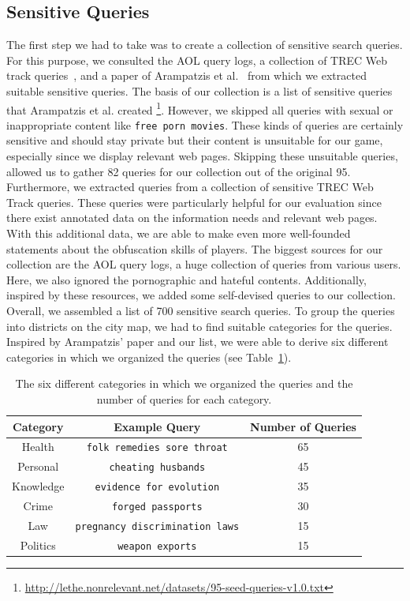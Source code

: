 \subsection{Sensitive Queries}
The first step we had to take was to create a collection of sensitive search queries. For this purpose, we consulted the AOL query logs, a collection of TREC Web track queries~\cite{anserini}, and a paper of Arampatzis et al.~\cite{arampatzis} from which we extracted suitable sensitive queries. The basis of our collection is a list of sensitive queries that Arampatzis et al. created \footnote{\url{http://lethe.nonrelevant.net/datasets/95-seed-queries-v1.0.txt}}. However, we skipped all queries with sexual or inappropriate content like \texttt{free porn movies}. These kinds of queries are certainly sensitive and should stay private but their content is unsuitable for our game, especially since we display relevant web pages. Skipping these unsuitable queries, allowed us to gather 82 queries for our collection out of the original 95. Furthermore, we extracted queries from a collection of sensitive TREC Web Track queries. These queries were particularly helpful for our evaluation since there exist annotated data on the information needs and relevant web pages. With this additional data, we are able to make even more well-founded statements about the obfuscation skills of players. The biggest sources for our collection are the AOL query logs, a huge collection of queries from various users. Here, we also ignored the pornographic and hateful contents. Additionally, inspired by these resources, we added some self-devised queries to our collection.
Overall, we assembled a list of 700 sensitive search queries. To group the queries into districts on the city map, we had to find suitable categories for the queries. Inspired by Arampatzis' paper \cite{arampatzis} and our list, we were able to derive six different categories in which we organized the queries (see Table~\ref{tab:category}).

\newpage
\begin{table}
\centering
\caption{The six different categories in which we organized the queries and the number of queries for each category.}
\label{tab:category}
\begin{tabular}[th]{ccc}
\toprule
Category & Example Query & Number of Queries\\
\midrule
Health & \texttt{folk remedies sore throat} & 65\\    
Personal & \texttt{cheating husbands} & 45\\    
Knowledge & \texttt{evidence for evolution} & 35\\ 
Crime & \texttt{forged passports} & 30\\ 
Law & \texttt{pregnancy discrimination laws} & 15\\ 
Politics & \texttt{weapon exports} & 15\\ 
\bottomrule
\end{tabular}
\end{table}

